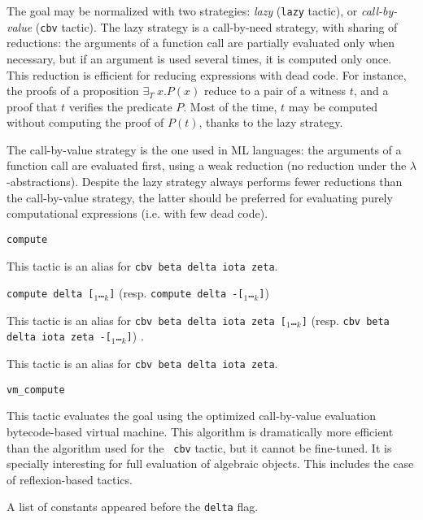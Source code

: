 The goal may be normalized with two strategies: {\em lazy} ({\tt lazy}
tactic), or {\em call-by-value} ({\tt cbv} tactic). The lazy strategy
is a call-by-need strategy, with sharing of reductions: the arguments of a
function call are partially evaluated only when necessary, but if an
argument is used several times, it is computed only once. This
reduction is efficient for reducing expressions with dead code. For
instance, the proofs of a proposition $\exists_T ~x. P(x)$ reduce to a
pair of a witness $t$, and a proof that $t$ verifies the predicate
$P$. Most of the time, $t$ may be computed without computing the proof
of $P(t)$, thanks to the lazy strategy.

The call-by-value strategy is the one used in ML languages: the
arguments of a function call are evaluated first, using a weak
reduction (no reduction under the $\lambda$-abstractions). Despite the
lazy strategy always performs fewer reductions than the call-by-value
strategy, the latter should be preferred for evaluating purely
computational expressions (i.e. with few dead code).

\begin{Variants}
\item {\tt compute}  
  
  This tactic is an alias for {\tt cbv beta delta iota zeta}.

\item {\tt compute delta [\qualid$_1$\ldots\qualid$_k$]} (resp. {\tt compute delta  -[\qualid$_1$\ldots\qualid$_k$]})   

      This tactic is an alias for {\tt cbv beta delta iota zeta [\qualid$_1$\ldots\qualid$_k$]} (resp. {\tt cbv beta delta iota zeta -[\qualid$_1$\ldots\qualid$_k$]}) .
  
  This tactic is an alias for {\tt cbv beta delta iota zeta}.

\item {\tt vm\_compute} 

  This tactic evaluates the goal using the optimized call-by-value
  evaluation bytecode-based virtual machine. This algorithm is
  dramatically more efficient than the algorithm used for the {\tt
  cbv} tactic, but it cannot be fine-tuned. It is specially
  interesting for full evaluation of algebraic objects. This includes
  the case of reflexion-based tactics.

\end{Variants}

\begin{ErrMsgs}
\item {}
  
  A list of constants appeared before the {\tt delta} flag.
\end{ErrMsgs}


